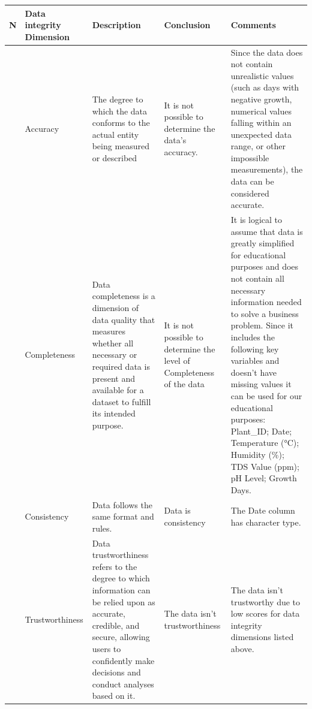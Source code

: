 \documentclass[
]{article}
\begin{document}
\begin{longtable}[]{@{}
  >{\raggedright\arraybackslash}p{}
  >{\raggedright\arraybackslash}p{}
  >{\raggedright\arraybackslash}p{}
  >{\raggedright\arraybackslash}p{}
  >{\raggedright\arraybackslash}p{}@{}}
\toprule\noalign{}
\begin{minipage}[b]{\linewidth}\raggedright
N
\end{minipage} & \begin{minipage}[b]{\linewidth}\raggedright
Data integrity Dimension
\end{minipage} & \begin{minipage}[b]{\linewidth}\raggedright
Description
\end{minipage} & \begin{minipage}[b]{\linewidth}\raggedright
Conclusion
\end{minipage} & \begin{minipage}[b]{\linewidth}\raggedright
Comments
\end{minipage} \\
\midrule\noalign{}
\endhead
\bottomrule\noalign{}
\endlastfoot
1 & Accuracy & The degree to which the data conforms to the actual
entity being measured or described & It is not possible to determine the
data's accuracy. & Since the data does not contain unrealistic values
(such as days with negative growth, numerical values falling within an
unexpected data range, or other impossible measurements), the data can
be considered accurate. \\
2 & Completeness & Data completeness is a dimension of data quality that
measures whether all necessary or required data is present and available
for a dataset to fulfill its intended purpose. & It is not possible to
determine the level of Completeness of the data & It is logical to
assume that data is greatly simplified for educational purposes and does
not contain all necessary information needed to solve a business
problem. Since it includes the following key variables and doesn't have
missing values it can be used for our educational purposes: Plant\_ID;
Date; Temperature (°C); Humidity (\%); TDS Value (ppm); pH Level; Growth
Days. \\
3 & Consistency & Data follows the same format and rules. & Data is
consistency & The Date column has character type. \\
4 & Trustworthiness & Data trustworthiness refers to the degree to which
information can be relied upon as accurate, credible, and secure,
allowing users to confidently make decisions and conduct analyses based
on it. & The data isn't trustworthiness & The data isn't trustworthy due
to low scores for data integrity dimensions listed above. \\
\end{longtable}
\end{document}
